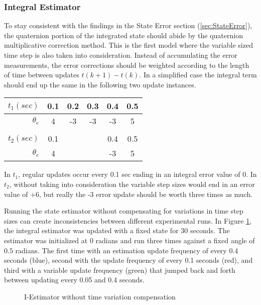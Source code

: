 \subsubsection{Integral Estimator}
\label{subsubsec:IntegralEstimator}

To stay consistent with the findings in the State Error section (\ref{sec:StateError}), the quaternion portion of the integrated state should abide by the quaternion multiplicative correction method.  This is the first model where the variable sized time step is also taken into consideration.  Instead of accumulating the error measurements, the error corrections should be weighted according to the length of time between updates $t(k+1) - t(k)$.  In a simplified case the integral term should end up the same in the following two update instances.

\begin{table}[H]
  \centering
  \begin{tabular}{r|c|c|c|c|c}
    $t_1 (sec)$ & 0.1 & 0.2 & 0.3 & 0.4 & 0.5 \\ \hline
    $\theta_e$ & 4 & -3 & -3 & -3 & 5 \\
    \\
    $t_2 (sec)$ & 0.1 & & & 0.4 & 0.5 \\ \hline
    $\theta_e$ & 4 &  &  & -3 & 5 \\
  \end{tabular}
  \label{tbl:VariableUpdates}
\end{table}

In $t_1$, regular updates occur every 0.1 sec ending in an integral error value of 0.  In $t_2$, without taking into consideration the variable step sizes would end in an error value of $+6$, but really the -3 error update should be worth three times as much.

Running the state estimator without compensating for variations in time step sizes can create inconsistencies between different experimental runs.  In Figure \ref{fig:IEstimatorwithouttimevariationcompensation}, the integral estimator was updated with a fixed state for 30 seconds.  The estimator was initialized at $0$ radians and run three times against a fixed angle of $0.5$ radians.  The first time with an estimation update frequency of every 0.4 seconds (blue), second with the update frequency of every 0.1 seconds (red), and third with a variable update frequency (green) that jumped back and forth between updating every 0.05 and 0.4 seconds.

\begin{figure}[H]
  \centerline{}
  \caption{I-Estimator without time variation compensation}
  \label{fig:IEstimatorwithouttimevariationcompensation}
\end{figure}

